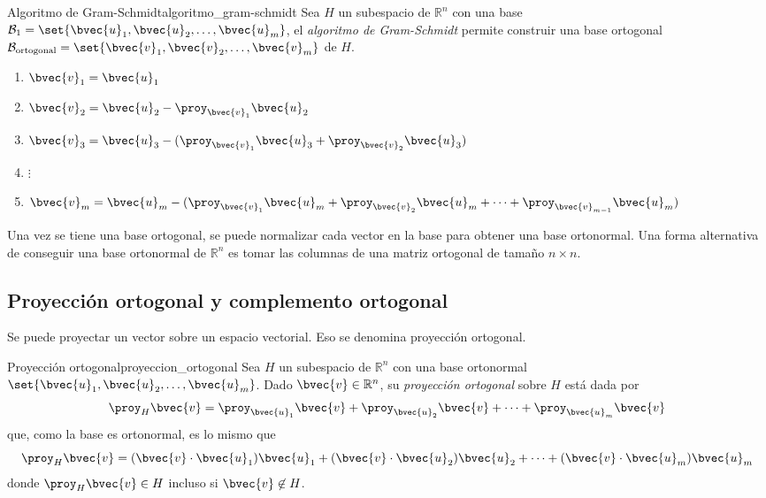 \documentclass{fmbnotes}
\begin{document}
\begin{teorema}{Algoritmo de Gram-Schmidt}{algoritmo_gram-schmidt}
	Sea \(H\) un subespacio de \(\mathbb{R}^{n}\) con una base \(\mathcal{B}_1=\set{\bvec{u}_1,\bvec{u}_2,\ldots,\bvec{u}_m}\), el \emph{algoritmo de Gram-Schmidt} permite construir una base ortogonal \(\mathcal{B}_\text{ortogonal}=\set{\bvec{v}_1,\bvec{v}_2,\ldots,\bvec{v}_m}\) de \(H\).
	\begin{enumerate}
		\item \( \bvec{v}_1 =\bvec{u}_1 \)
		\item \( \bvec{v}_2 =\bvec{u}_2-\proy_{\bvec{v}_1}\bvec{u}_2\)
		\item \( \bvec{v}_3=\bvec{u}_3-(\proy_{\bvec{v}_1}\bvec{u}_3+\proy_{\bvec{v}_2}\bvec{u}_3)\)
		\item \( \vdots \)
		\item \( \bvec{v}_m=\bvec{u}_m-(\proy_{\bvec{v}_1}\bvec{u}_m+\proy_{\bvec{v}_2}\bvec{u}_m+\cdots+\proy_{\bvec{v}_{m-1}}\bvec{u}_m)\)
	\end{enumerate}
\end{teorema}


Una vez se tiene una base ortogonal, se puede normalizar cada vector en la base para obtener una base ortonormal. 
Una forma alternativa de conseguir una base ortonormal de \(\mathbb{R}^{n}\) es tomar las columnas de una matriz ortogonal de tamaño \(n\times n\).

\subsection{Proyección ortogonal y complemento ortogonal}

Se puede proyectar un vector sobre un espacio vectorial. Eso se denomina proyección ortogonal.

\begin{definicion}{Proyección ortogonal}{proyeccion_ortogonal}
	Sea \(H\) un subespacio de \(\mathbb{R}^{n}\) con una base ortonormal \(\set{\bvec{u}_1,\bvec{u}_2,\ldots,\bvec{u}_m}\). Dado \(\bvec{v}\in\mathbb{R}^{n}\), su \emph{proyección ortogonal} sobre \(H\) está dada por
	\[\proy_H \bvec{v} = \proy_{\bvec{u}_1}\bvec{v}+\proy_{\bvec{u}_2}\bvec{v}+\cdots+\proy_{\bvec{u}_m}\bvec{v}\] 
	que, como la base es ortonormal, es lo mismo que
	\[\proy_H \bvec{v} = (\bvec{v}\cdot\bvec{u}_1)\bvec{u}_1+(\bvec{v}\cdot\bvec{u}_2)\bvec{u}_2+\cdots+(\bvec{v}\cdot\bvec{u}_m)\bvec{u}_m\]
	donde \(\proy_H \bvec{v} \in H\) incluso si \(\bvec{v} \not\in H\).
\end{definicion}
\end{document}
